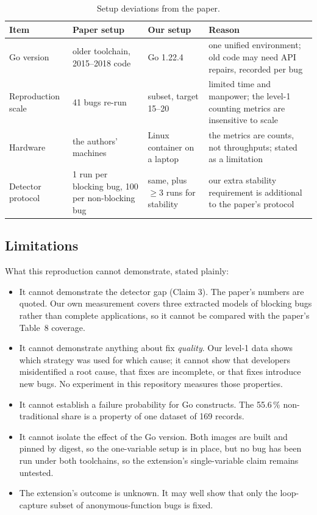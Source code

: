 \documentclass[11pt]{article}
\begin{document}
\begin{table}[h]
\centering
\caption{Setup deviations from the paper.}
\label{tab:deviations}
\begin{tabular}{@{}p{}p{}p{}p{}@{}}
\toprule
Item & Paper setup & Our setup & Reason \\
\midrule
Go version & older toolchain, 2015--2018 code & Go 1.22.4 & one unified
  environment; old code may need API repairs, recorded per bug \\
Reproduction scale & 41 bugs re-run & subset, target 15--20 & limited time
  and manpower; the level-1 counting metrics are insensitive to scale \\
Hardware & the authors' machines & Linux container on a laptop & the metrics
  are counts, not throughputs; stated as a limitation \\
Detector protocol & 1 run per blocking bug, 100 per non-blocking bug & same,
  plus $\geq 3$ runs for stability & our extra stability requirement is
  additional to the paper's protocol \\
\bottomrule
\end{tabular}
\end{table}

\subsection{Limitations}

What this reproduction cannot demonstrate, stated plainly:

\begin{itemize}
\item It cannot demonstrate the detector gap (Claim 3). The paper's numbers
are quoted. Our own measurement covers three extracted models of blocking
bugs rather than complete applications, so it cannot be compared with the
paper's Table~8 coverage.
\item It cannot demonstrate anything about fix \emph{quality}. Our level-1
data shows which strategy was used for which cause; it cannot show that
developers misidentified a root cause, that fixes are incomplete, or that
fixes introduce new bugs. No experiment in this repository measures those
properties.
\item It cannot establish a failure probability for Go constructs. The
55.6\,\% non-traditional share is a property of one dataset of 169 records.
\item It cannot isolate the effect of the Go version. Both images are built
and pinned by digest, so the one-variable setup is in place, but no bug has
been run under both toolchains, so the extension's single-variable claim
remains untested.
\item The extension's outcome is unknown. It may well show that only the
loop-capture subset of anonymous-function bugs is fixed.
\end{itemize}
\end{document}
